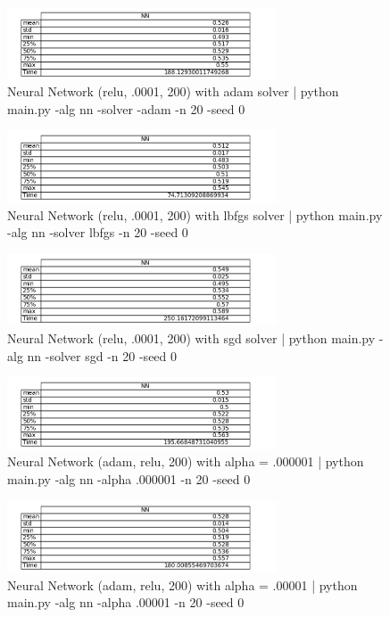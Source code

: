 \documentclass{article}
\begin{document}
\begin{figure}
\begin{center}
\includegraphics[width=8cm]{images/nn_adam}
\caption{Neural Network (relu, .0001, 200) with adam solver | python main.py -alg nn -solver -adam -n 20 -seed 0}
\end{center}
\end{figure}
\begin{figure}
\begin{center}
\includegraphics[width=8cm]{images/nn_lbfgs}
\caption{Neural Network (relu, .0001, 200) with lbfgs solver | python main.py -alg nn -solver lbfgs -n 20 -seed 0}
\end{center}
\end{figure}
\begin{figure}
\begin{center}
\includegraphics[width=8cm]{images/nn_sgd}
\caption{Neural Network (relu, .0001, 200) with sgd solver | python main.py -alg nn -solver sgd -n 20 -seed 0}
\end{center}
\end{figure}
\begin{figure}
\begin{center}
\includegraphics[width=8cm]{images/nn_000001}
\caption{Neural Network (adam, relu, 200) with alpha = .000001 | python main.py -alg nn -alpha .000001 -n 20 -seed 0}
\end{center}
\end{figure}
\begin{figure}
\begin{center}
\includegraphics[width=8cm]{images/nn_00001}
\caption{Neural Network (adam, relu, 200) with alpha = .00001 | python main.py -alg nn -alpha .00001 -n 20 -seed 0}
\end{center}
\end{figure}
\end{document}
